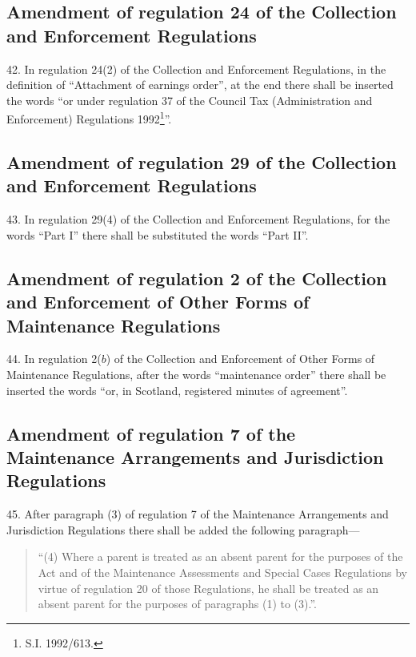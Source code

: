 \documentclass[a4paper]{article}
\begin{document}
\subsection[42. Amendment of regulation 24 of the Collection and Enforcement Regulations]{Amendment of regulation 24 of the Collection and Enforcement Regulations}

42.  In regulation 24(2) of the Collection and Enforcement Regulations, in the definition of “Attachment of earnings order”, at the end there shall be inserted the words “or under regulation 37 of the Council Tax (Administration and Enforcement) Regulations 1992\footnote{\frenchspacing  S.I. 1992/613.}”.

\subsection[43. Amendment of regulation 29 of the Collection and Enforcement Regulations]{Amendment of regulation 29 of the Collection and Enforcement Regulations}

43.  In regulation 29(4) of the Collection and Enforcement Regulations, for the words “Part I” there shall be substituted the words “Part II”.

\subsection[44. Amendment of regulation 2 of the Collection and Enforcement of Other Forms of Maintenance Regulations]{Amendment of regulation 2 of the Collection and Enforcement of Other Forms of Maintenance Regulations}

44.  In regulation 2($b$) of the Collection and Enforcement of Other Forms of Maintenance Regulations, after the words “maintenance order” there shall be inserted the words “or, in Scotland, registered minutes of agreement”.

\subsection[45. Amendment of regulation 7 of the Maintenance Arrangements and Jurisdiction Regulations]{Amendment of regulation 7 of the Maintenance Arrangements and Jurisdiction Regulations}

45.  After paragraph (3) of regulation 7 of the Maintenance Arrangements and Jurisdiction Regulations there shall be added the following paragraph---
\begin{quotation}
“(4) Where a parent is treated as an absent parent for the purposes of the Act and of the Maintenance Assessments and Special Cases Regulations by virtue of regulation 20 of those Regulations, he shall be treated as an absent parent for the purposes of paragraphs (1) to (3).”.
\end{quotation}
\end{document}
